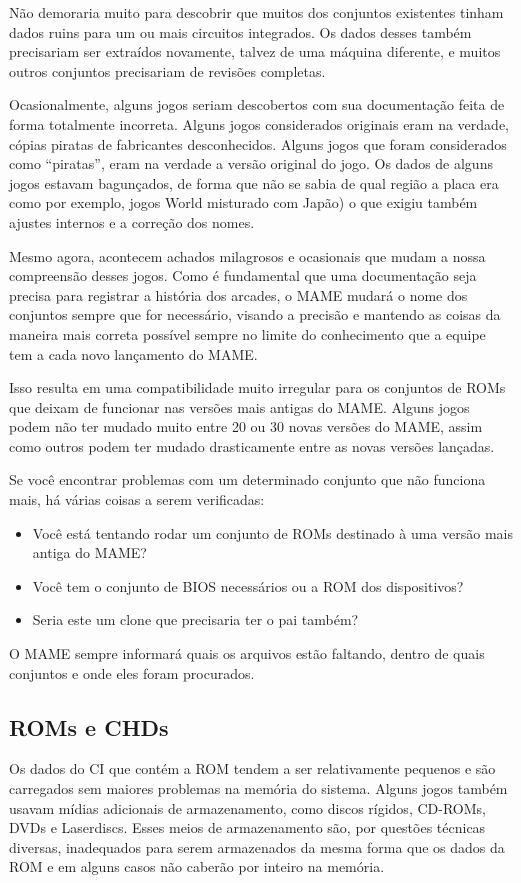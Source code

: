 \documentclass[letterpaper,10pt,brazil]{sphinxmanual}
\begin{document}
Não demoraria muito para descobrir que muitos dos conjuntos existentes
tinham dados ruins para um ou mais circuitos integrados. Os dados desses
também precisariam ser extraídos novamente, talvez de uma máquina
diferente, e muitos outros conjuntos precisariam de revisões completas.

Ocasionalmente, alguns jogos seriam descobertos com sua documentação
feita de forma totalmente incorreta. Alguns jogos considerados originais
eram na verdade, cópias piratas de fabricantes desconhecidos. Alguns
jogos que foram considerados como ``piratas'', eram na verdade a versão
original do jogo. Os dados de alguns jogos estavam bagunçados, de forma
que não se sabia de qual região a placa era como por exemplo, jogos
World misturado com Japão) o que exigiu também ajustes internos e a
correção dos nomes.

Mesmo agora, acontecem achados milagrosos e ocasionais que mudam a nossa
compreensão desses jogos. Como é fundamental que uma documentação seja
precisa para registrar a história dos arcades, o MAME mudará o nome dos
conjuntos sempre que for necessário, visando a precisão e mantendo as
coisas da maneira mais correta possível sempre no limite do conhecimento
que a equipe tem a cada novo lançamento do MAME.

Isso resulta em uma compatibilidade muito irregular para os conjuntos de
ROMs que deixam de funcionar nas versões mais antigas do MAME.
Alguns jogos podem não ter mudado muito entre 20 ou 30 novas versões
do MAME, assim como outros podem ter mudado drasticamente entre as novas
versões lançadas.

Se você encontrar problemas com um determinado conjunto que não funciona
mais, há várias coisas a serem verificadas:
\begin{itemize}
\item {} 
Você está tentando rodar um conjunto de ROMs destinado à uma versão
mais antiga do MAME?

\item {} 
Você tem o conjunto de BIOS necessários ou a ROM dos dispositivos?

\item {} 
Seria este um clone que precisaria ter o pai também?

\end{itemize}

O MAME sempre informará quais os arquivos estão faltando, dentro de
quais conjuntos e onde eles foram procurados.


\subsection{ROMs e CHDs}
\label{usingmame/aboutromsets:roms-e-chds}
Os dados do CI que contém a ROM tendem a ser relativamente pequenos
e são carregados sem maiores problemas na memória do sistema.
Alguns jogos também usavam mídias adicionais de armazenamento, como
discos rígidos, CD-ROMs, DVDs e Laserdiscs. Esses meios de armazenamento
são, por questões técnicas diversas, inadequados para serem armazenados
da mesma forma que os dados da ROM e em alguns casos não caberão por
inteiro na memória.
\end{document}
